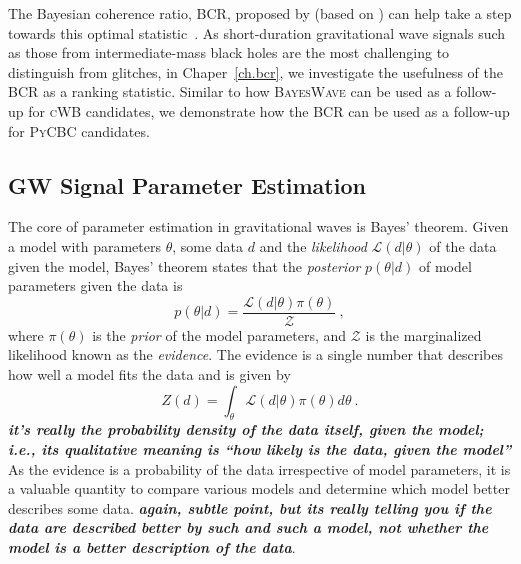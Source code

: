 The Bayesian coherence ratio, \textsc{BCR}, proposed by \citet{bcr_paper} (based on \citet{bci}) can help take a step towards this optimal statistic~\cite{bci, bayeswave_as_followup, bcr_paper, bootstrap_gw, bcr_gw151216,bcr_gw151216, bayesian_odds}. 
As short-duration gravitational wave signals such as those from intermediate-mass black holes are the most challenging to distinguish from glitches, in Chaper~\ref{ch.bcr}, we investigate the usefulness of the \textsc{BCR} as a ranking statistic. 
Similar to how \textsc{BayesWave} can be used as a follow-up for \textsc{cWB} candidates, we demonstrate how the \textsc{BCR} can be used as a follow-up for \textsc{PyCBC} candidates. 

\subsection{GW Signal Parameter Estimation}

The core of parameter estimation in gravitational waves is Bayes' theorem. 
Given a model with parameters $\theta$, some data $d$ and the \textit{likelihood} $\mathcal{L}(d|\theta)$ of the data given the model, Bayes' theorem states that the \textit{posterior} $p(\theta|d)$ of model parameters given the data is 
\begin{equation}
{p(\theta|d)} = \frac{\mathcal{L}(d|\theta)\pi(\theta)}{\mathcal{Z}}\ , \label{eq:bayeTheorem}
\end{equation}
where $\pi(\theta)$ is the \textit{prior} of the model parameters, and $\mathcal{Z}$ is the marginalized likelihood known as the
\textit{evidence}. 
The evidence is a single number that describes how well a model fits the data and is given by 
\begin{equation}
Z(d) = \int_\theta \mathcal{L}(d|\theta)\pi(\theta)d\theta\ .
\label{eq:evid}
\end{equation}
\textit{\textbf{it's really the probability density of the data itself, given the model; i.e., its qualitative meaning is ``how likely is the data, given the model''}}
As the evidence is a probability of the data irrespective of model parameters, it is a valuable quantity to compare various models and determine which model better describes some data. \textbf{\textit{again, subtle point, but its really telling you if the data are described better by such and such a model, not whether the model is a better description of the data}}.

